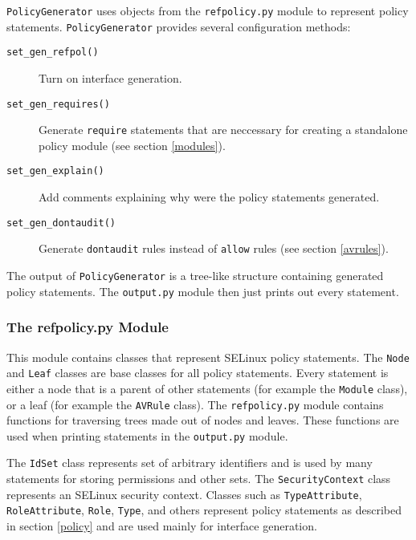\texttt{PolicyGenerator} uses objects from the \texttt{refpolicy.py} module
to represent policy statements. \texttt{PolicyGenerator} provides several
configuration methods:
\begin{description}
    \item [\texttt{set\_gen\_refpol()}] Turn on interface generation.
    \item [\texttt{set\_gen\_requires()}] Generate \texttt{require} statements
        that are neccessary for creating a standalone policy module (see section
        \ref{modules}).
    \item [\texttt{set\_gen\_explain()}] Add comments explaining why were the
        policy statements generated.
    \item [\texttt{set\_gen\_dontaudit()}] Generate \texttt{dontaudit} rules
        instead of \texttt{allow} rules (see section \ref{avrules}).
\end{description}
The output of \texttt{PolicyGenerator} is a tree-like structure containing
generated policy statements. The \texttt{output.py} module then just prints out
every statement.

\subsubsection{The refpolicy.py Module}
This module contains classes that represent SELinux policy statements. The
\texttt{Node} and \texttt{Leaf} classes are base classes for all policy
statements. Every statement is either a node that is a parent of other
statements (for example the \texttt{Module} class), or a leaf (for example the
\texttt{AVRule} class). The \texttt{refpolicy.py} module contains functions for
traversing trees made out of nodes and leaves. These functions are used when
printing statements in the \texttt{output.py} module.

The \texttt{IdSet} class represents set of arbitrary identifiers and is used by
many statements for storing permissions and other sets. The
\texttt{SecurityContext} class represents an SELinux security context. Classes
such as \texttt{TypeAttribute}, \texttt{RoleAttribute}, \texttt{Role},
\texttt{Type}, and others represent policy statements as described in section
\ref{policy} and are used mainly for interface generation.

